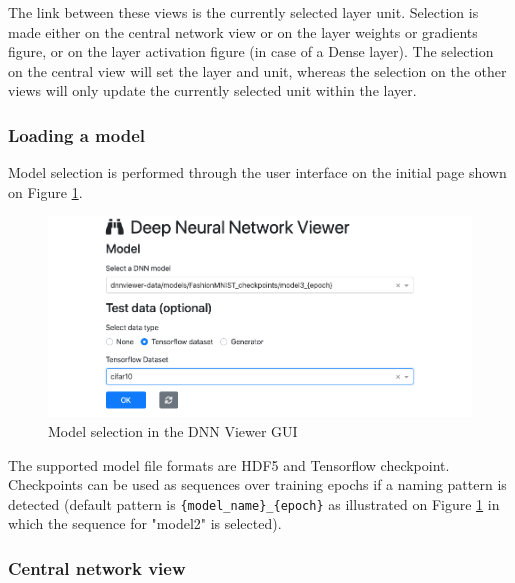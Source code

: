 The link between these views is the currently selected layer unit. Selection is made either on the central network view or on the layer weights or gradients figure, or on the layer activation figure (in case of a Dense layer). The selection on the central view will set the layer and unit, whereas the selection on the other views will only update the currently selected unit within the layer. 


\subsubsection{Loading a model}

Model selection is performed through the user interface on the initial page shown on Figure \ref{fig:dnn-viewer-model-selection}.

\begin{figure}[H]
    \centering
    \includegraphics[scale=0.3]{images/dnn-viewer/ModelSelection.png}
    \caption{Model selection in the DNN Viewer GUI}
    \label{fig:dnn-viewer-model-selection}
\end{figure}

The supported model file formats are  HDF5 and Tensorflow checkpoint. Checkpoints can be used as sequences over training epochs if a naming pattern is detected (default pattern is \verb|{model_name}_{epoch}| as illustrated on Figure \ref{fig:dnn-viewer-model-selection} in which the sequence for "model2" is selected).

\subsubsection{Central network view}


